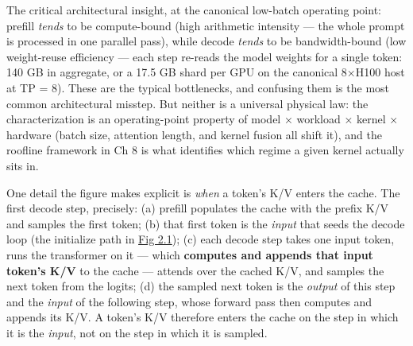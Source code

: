 The critical architectural insight, at the canonical low-batch operating
point: prefill \emph{tends} to be compute-bound (high arithmetic
intensity --- the whole prompt is processed in one parallel pass), while
decode \emph{tends} to be bandwidth-bound (low weight-reuse efficiency
--- each step re-reads the model weights for a single token: 140 GB in
aggregate, or a 17.5 GB shard per GPU on the canonical 8×H100 host at TP
= 8). These are the typical bottlenecks, and confusing them is the most
common architectural misstep. But neither is a universal physical law:
the characterization is an operating-point property of model × workload
× kernel × hardware (batch size, attention length, and kernel fusion all
shift it), and the roofline framework in Ch 8 is what identifies which
regime a given kernel actually sits in.

One detail the figure makes explicit is \emph{when} a token's K/V enters
the cache. The first decode step, precisely: (a) prefill populates the
cache with the prefix K/V and samples the first token; (b) that first
token is the \emph{input} that seeds the decode loop (the initialize
path in \hyperref[fig:2.1]{Fig 2.1}); (c) each decode step takes one input token, runs the
transformer on it --- which \textbf{computes and appends that input
token's K/V} to the cache --- attends over the cached K/V, and samples
the next token from the logits; (d) the sampled next token is the
\emph{output} of this step and the \emph{input} of the following step,
whose forward pass then computes and appends its K/V. A token's K/V
therefore enters the cache on the step in which it is the \emph{input},
not on the step in which it is sampled.


